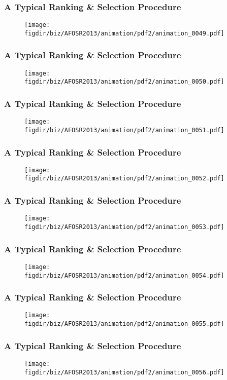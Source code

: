 \documentclass[13pt]{beamer}
\newcommand{\figdir}{../../fig}
\begin{document}
\begin{frame}\frametitle{A Typical Ranking \& Selection Procedure}\begin{figure}\texttt{[image: \\figdir/biz/AFOSR2013/animation/pdf2/animation\_0049.pdf]}\end{figure}\end{frame}
\begin{frame}\frametitle{A Typical Ranking \& Selection Procedure}\begin{figure}\texttt{[image: \\figdir/biz/AFOSR2013/animation/pdf2/animation\_0050.pdf]}\end{figure}\end{frame}
\begin{frame}\frametitle{A Typical Ranking \& Selection Procedure}\begin{figure}\texttt{[image: \\figdir/biz/AFOSR2013/animation/pdf2/animation\_0051.pdf]}\end{figure}\end{frame}
\begin{frame}\frametitle{A Typical Ranking \& Selection Procedure}\begin{figure}\texttt{[image: \\figdir/biz/AFOSR2013/animation/pdf2/animation\_0052.pdf]}\end{figure}\end{frame}
\begin{frame}\frametitle{A Typical Ranking \& Selection Procedure}\begin{figure}\texttt{[image: \\figdir/biz/AFOSR2013/animation/pdf2/animation\_0053.pdf]}\end{figure}\end{frame}
\begin{frame}\frametitle{A Typical Ranking \& Selection Procedure}\begin{figure}\texttt{[image: \\figdir/biz/AFOSR2013/animation/pdf2/animation\_0054.pdf]}\end{figure}\end{frame}
\begin{frame}\frametitle{A Typical Ranking \& Selection Procedure}\begin{figure}\texttt{[image: \\figdir/biz/AFOSR2013/animation/pdf2/animation\_0055.pdf]}\end{figure}\end{frame}
\begin{frame}\frametitle{A Typical Ranking \& Selection Procedure}\begin{figure}\texttt{[image: \\figdir/biz/AFOSR2013/animation/pdf2/animation\_0056.pdf]}\end{figure}\end{frame}
\end{document}
